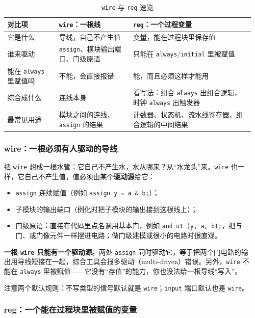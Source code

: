 \begin{table}[htbp]
\centering
\caption{\texttt{wire} 与 \texttt{reg} 速览}
\label{tab:02-hdl-wire-reg}
\begin{tabularx}{\linewidth}{@{}P{27mm}YY@{}}
\toprule
对比项 & \texttt{wire}：一根线 & \texttt{reg}：一个过程变量 \\
\midrule
它是什么 & 导线，自己不产生值 & 变量，能在过程块里保存值 \\
谁来驱动 & \texttt{assign}、模块输出端口、门级原语 & 只能在 \texttt{always}/\texttt{initial} 里被赋值 \\
能在 \texttt{always} 里赋值吗 & 不能，会直接报错 & 能，而且必须这样才能用 \\
综合成什么 & 连线本身 & 看写法：组合 \texttt{always} 出组合逻辑，时钟 \texttt{always} 出触发器 \\
最常见用途 & 模块之间的连线、\texttt{assign} 的结果 & 计数器、状态机、流水线寄存器、组合逻辑的中间结果 \\
\bottomrule
\end{tabularx}
\end{table}

\subsubsection*{wire：一根必须有人驱动的导线}

把 \texttt{wire} 想成一根水管：它自己不产生水，水从哪来？从“水龙头”来。\texttt{wire} 也一样，它自己不产生值，值必须由某个\textbf{驱动源}给它：

\begin{itemize}
  \item \texttt{assign} 连续赋值（例如 \texttt{assign y = a \& b;}）；
  \item 子模块的输出端口（例化时把子模块的输出接到这根线上）；
  \item 门级原语：直接在代码里点名调用基本门，例如 \texttt{and u1 (y, a, b);}，把与门、或门像元件一样摆进电路；做门级建模或很小的电路时很直观。
\end{itemize}

\textbf{一根 \texttt{wire} 只能有一个驱动源}。两处 \texttt{assign} 同时驱动它，等于把两个门电路的输出用导线短接在一起，综合工具会报多驱动（multi-driven）错误。另外，\texttt{wire} 不能在 \texttt{always} 里被赋值——它没有“存值”的能力，你也没法给一根导线“写入”。

注意两个默认规则：不写类型的信号默认就是 \texttt{wire}；\texttt{input} 端口默认也是 \texttt{wire}。

\subsubsection*{reg：一个能在过程块里被赋值的变量}

